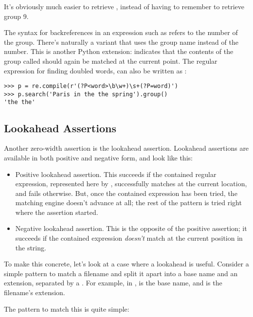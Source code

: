 \documentclass{howto}
\begin{document}
It's obviously much easier to retrieve ,
instead of having to remember to retrieve group 9.

The syntax for backreferences in an expression such as
 refers to the number of the group.  There's
naturally a variant that uses the group name instead of the number.
This is another Python extension:  indicates
that the contents of the group called  should again be matched
at the current point.  The regular expression for finding doubled
words,  can also be written as
:

\begin{verbatim}
>>> p = re.compile(r'(?P<word>\b\w+)\s+(?P=word)')
>>> p.search('Paris in the the spring').group()
'the the'
\end{verbatim}

\subsection{Lookahead Assertions}

Another zero-width assertion is the lookahead assertion.  Lookahead
assertions are available in both positive and negative form, and 
look like this:

\begin{itemize}
\item[\regexp{(?=...)}] Positive lookahead assertion.  This succeeds
if the contained regular expression, represented here by ,
successfully matches at the current location, and fails otherwise.
But, once the contained expression has been tried, the matching engine
doesn't advance at all; the rest of the pattern is tried right where
the assertion started.

\item[\regexp{(?!...)}] Negative lookahead assertion.  This is the
opposite of the positive assertion; it succeeds if the contained expression
\emph{doesn't} match at the current position in the string.
\end{itemize}

To make this concrete, let's look at a case where a lookahead is
useful.  Consider a simple pattern to match a filename and split it
apart into a base name and an extension, separated by a .  For
example, in ,  is the base name, and
 is the filename's extension.

The pattern to match this is quite simple: 
\end{document}
